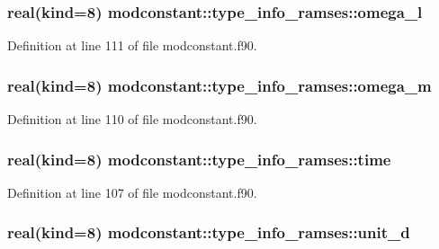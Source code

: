 \hypertarget{structmodconstant_1_1type__info__ramses_abcae4797c8ecb670ee829c1fa7c75ee5}{
\subsubsection[{omega\-\_\-l}]{\setlength{\rightskip}{0pt plus 5cm}real(kind=8) modconstant\-::type\-\_\-info\-\_\-ramses\-::omega\-\_\-l}}\label{structmodconstant_1_1type__info__ramses_abcae4797c8ecb670ee829c1fa7c75ee5}


Definition at line 111 of file modconstant.\-f90.

\hypertarget{structmodconstant_1_1type__info__ramses_a77106df82f929843d1effa4dbb30ca50}{
\subsubsection[{omega\-\_\-m}]{\setlength{\rightskip}{0pt plus 5cm}real(kind=8) modconstant\-::type\-\_\-info\-\_\-ramses\-::omega\-\_\-m}}\label{structmodconstant_1_1type__info__ramses_a77106df82f929843d1effa4dbb30ca50}


Definition at line 110 of file modconstant.\-f90.

\hypertarget{structmodconstant_1_1type__info__ramses_adc56fe5d020573066203da42ac039409}{
\subsubsection[{time}]{\setlength{\rightskip}{0pt plus 5cm}real(kind=8) modconstant\-::type\-\_\-info\-\_\-ramses\-::time}}\label{structmodconstant_1_1type__info__ramses_adc56fe5d020573066203da42ac039409}


Definition at line 107 of file modconstant.\-f90.

\hypertarget{structmodconstant_1_1type__info__ramses_ab9cc0d348b8bebd2f004672e175a4677}{
\subsubsection[{unit\-\_\-d}]{\setlength{\rightskip}{0pt plus 5cm}real(kind=8) modconstant\-::type\-\_\-info\-\_\-ramses\-::unit\-\_\-d}}\label{structmodconstant_1_1type__info__ramses_ab9cc0d348b8bebd2f004672e175a4677}


